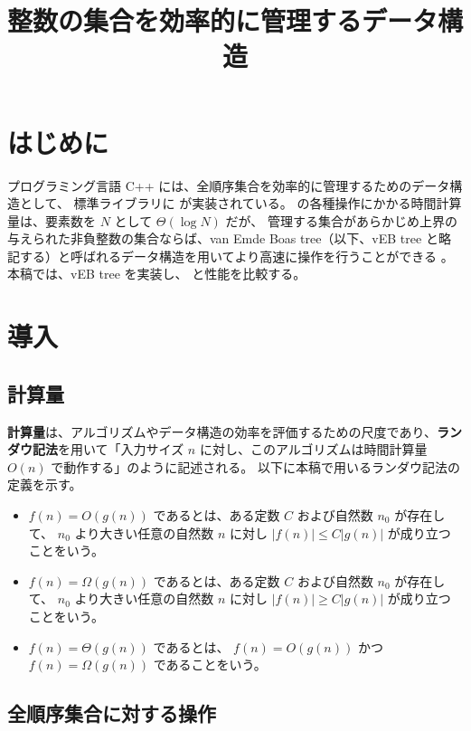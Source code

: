 \documentclass[dvipdfmx,a4j,10pt]{jarticle}
\begin{document}
\title{整数の集合を効率的に管理するデータ構造}
\date{}
\maketitle

\section{はじめに}

プログラミング言語 C++ には、全順序集合を効率的に管理するためのデータ構造として、
標準ライブラリに  が実装されている。
 の各種操作にかかる時間計算量は、要素数を $N$ として $\Theta (\log N)$ だが、
管理する集合があらかじめ上界の与えられた非負整数の集合ならば、van Emde Boas tree（以下、vEB tree と略記する）と呼ばれるデータ構造を用いてより高速に操作を行うことができる \cite{AlgorithmIntroduction}。
本稿では、vEB tree を実装し、 と性能を比較する。

\section{導入}

\subsection{計算量}

\textbf{計算量}は、アルゴリズムやデータ構造の効率を評価するための尺度であり、\textbf{ランダウ記法}を用いて「入力サイズ $n$ に対し、このアルゴリズムは時間計算量 $O(n)$ で動作する」のように記述される。
以下に本稿で用いるランダウ記法の定義を示す。

\begin{itemize}
  \item 
    $f(n) = O(g(n))$ であるとは、ある定数 $C$ および自然数 $n_0$ が存在して、
    $n_0$ より大きい任意の自然数 $n$ に対し $|f(n)| \leq C|g(n)|$ が成り立つことをいう。
  \item 
    $f(n) = \Omega(g(n))$ であるとは、ある定数 $C$ および自然数 $n_0$ が存在して、
    $n_0$ より大きい任意の自然数 $n$ に対し $|f(n)| \geq C|g(n)|$ が成り立つことをいう。
  \item 
    $f(n) = \Theta(g(n))$ であるとは、
    $f(n) = O(g(n))$ かつ $f(n) = \Omega(g(n))$ であることをいう。
\end{itemize}

\subsection{全順序集合に対する操作}
\end{document}
